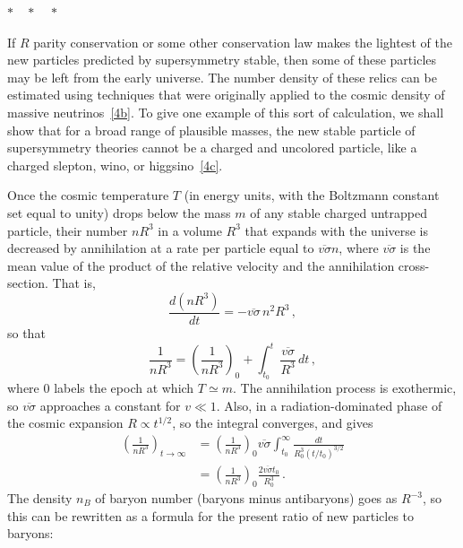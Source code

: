\begin{center}
  \(*\quad *\quad *\)
\end{center}

If \(R\) parity conservation or some other conservation law makes the
lightest of the new particles predicted by supersymmetry stable, then
some of these particles may be left from the early universe. The number
density of these relics can be estimated using techniques that were
originally applied to the cosmic density of massive
neutrinos~\hyperref[ch28-ref-4b]{[4b]}. To give one example of this sort
of calculation, we shall show that for a broad range of plausible
masses, the new stable particle of supersymmetry theories cannot be a
charged and uncolored particle, like a charged slepton, wino, or
higgsino~\hyperref[ch28-ref-4c]{[4c]}.

Once the cosmic temperature \(T\) (in energy units, with the Boltzmann
constant set equal to unity) drops below the mass \(m\) of any stable
charged untrapped particle, their number \(nR^3\) in a volume \(R^3\)
that expands with the universe is decreased by annihilation at a rate
per particle equal to \(\overline{v\sigma}n\), where
\(\overline{v\sigma}\) is the mean value of the product of the relative
velocity and the annihilation cross-section. That is,
\[
  \frac{d(nR^3)}{dt}
  =-\overline{v\sigma}\,n^2R^3\,,
\]
so that
\begin{equation}
  \frac{1}{nR^3}
  =\left(\frac{1}{nR^3}\right)_0
  +\int_{t_0}^{t}\frac{\overline{v\sigma}}{R^3}\,dt\,,
  \tag{28.1.8}\label{eq:28.1.8}
\end{equation}
where 0 labels the epoch at which \(T\simeq m\). The annihilation
process is exothermic, so \(\overline{v\sigma}\) approaches a constant
for \(v\ll1\). Also, in a radiation-dominated phase of the cosmic
expansion \(R\propto t^{1/2}\), so the integral converges, and gives
\begin{equation}
  \begin{aligned}
  \left(\frac{1}{nR^3}\right)_{t\to\infty}
  &=
  \left(\frac{1}{nR^3}\right)_0
  \overline{v\sigma}
    \int_{t_0}^{\infty}\frac{dt}{R_0^3(t/t_0)^{3/2}}
  \\
  &=
  \left(\frac{1}{nR^3}\right)_0
  \frac{2\overline{v\sigma}t_0}{R_0^3}\,.
  \end{aligned}
  \tag{28.1.9}\label{eq:28.1.9}
\end{equation}
The density \(n_B\) of baryon number (baryons minus antibaryons) goes as
\(R^{-3}\), so this can be rewritten as a formula for the present ratio
of new particles to baryons:
